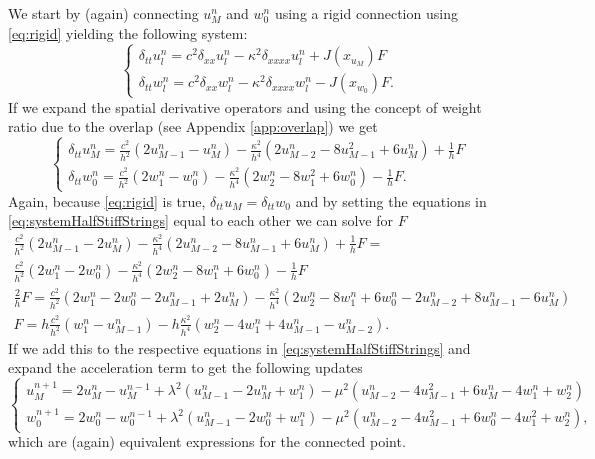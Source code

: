\documentclass[dvipsnames]{article}
\begin{document}
We start by (again) connecting $u_{M}^n$ and $w_0^n$ using a rigid connection using \eqref{eq:rigid} yielding the following system:
\begin{equation}
    \begin{cases}
        \delta_{tt}u_l^n = c^2\delta_{xx}u_l^n-\kappa^2\delta_{xxxx}u_l^n + J(x_{u_M})F\\
        \delta_{tt}w_l^n = c^2\delta_{xx}w_l^n -\kappa^2\delta_{xxxx}w_l^n - J(x_{w_0})F.
    \end{cases} 
\end{equation}
If we expand the spatial derivative operators and using the concept of weight ratio due to the overlap (see Appendix \ref{app:overlap}) we get
\begin{equation}\label{eq:systemHalfStiffStrings}
    \begin{cases}
        \delta_{tt}u_M^n = \frac{c^2}{h^2}(2u_{M-1}^n-u_M^n)-\frac{\kappa^2}{h^4}(2u_{M-2}^n - 8u_{M-1}^2+6u_M^n) + \frac{1}{h}F\\
        \delta_{tt}w_0^n = \frac{c^2}{h^2}(2w_1^n-w_0^n)-\frac{\kappa^2}{h^4}(2w_2^n - 8w_1^2+6w_0^n) - \frac{1}{h}F.
    \end{cases} 
\end{equation}
Again, because \eqref{eq:rigid} is true, $\delta_{tt}u_M = \delta_{tt}w_0$ and by setting the equations in \eqref{eq:systemHalfStiffStrings} equal to each other we can solve for $F$
\begin{gather}
    \frac{c^2}{h^2}(2u_{M-1}^n- 2u_M^n)-\frac{\kappa^2}{h^4}(2u_{M-2}^n - 8u_{M-1}^n + 6 u_M^n) + \frac{1}{h}F =  \nonumber\\
    \frac{c^2}{h^2}(2w_1^n - 2w_0^n) -\frac{\kappa^2}{h^4}(2w_2^n - 8w_1^n + 6w_0^n) - \frac{1}{h}F\nonumber\\
    \frac{2}{h}F = \frac{c^2}{h^2}(2w_1^n - 2w_0^n-2u_{M-1}^n+2u_M^n)-\frac{\kappa^2}{h^4}(2w_2^n - 8w_1^n + 6w_0^n - 2u_{M-2}^n + 8u_{M-1}^n - 6u_M^n)\nonumber\\
    F = h\frac{c^2}{h^2}(w_1^n-u_{M-1}^n)-h\frac{\kappa^2}{h^4}(w_2^n-4w_1^n+4u_{M-1}^n-u_{M-2}^n).
\end{gather}
If we add this to the respective equations in \eqref{eq:systemHalfStiffStrings} and expand the acceleration term to get the following updates
\begin{equation}\label{eq:systemHalfStiffStrings}
    \begin{cases}
        u_M^{n+1} = 2u_M^n - u_M^{n-1}+ \lambda^2(u_{M-1}^n-2u_M^n+w_1^n)-\mu^2(u_{M-2}^n - 4u_{M-1}^2+6u_M^n-4w_1^n+w_2^n)\\
        w_0^{n+1} = 2w_0^n - w_0^{n-1}+ \lambda^2(u_{M-1}^n-2w_0^n+w_1^n)-\mu^2(u_{M-2}^n - 4u_{M-1}^2 + 6w_0^n - 4w_1^2 + w_2^n),
    \end{cases} 
\end{equation}
which are (again) equivalent expressions for the connected point. 
\end{document}
